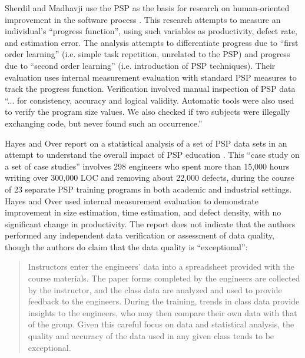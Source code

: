 Sherdil and Madhavji use the PSP as the basis for research on
human-oriented improvement in the software process \cite{Sherdil96}.  This
research attempts to measure an individual's ``progress function'', using
such variables as productivity, defect rate, and estimation error.  The
analysis attempts to differentiate progress due to ``first order learning''
(i.e. simple task repetition, unrelated to the PSP) and progress due to
``second order learning'' (i.e. introduction of PSP techniques).  Their
evaluation uses internal measurement evaluation with standard PSP measures
to track the progress function.  Verification involved manual inspection of
PSP data ``... for consistency, accuracy and logical validity.  Automatic
tools were also used to verify the program size values.  We also checked if
two subjects were illegally exchanging code, but never found such an
occurrence.''  


Hayes and Over report on a statistical analysis of a set of PSP data sets
in an attempt to understand the overall impact of PSP education
\cite{Hayes97}.  This ``case study on a set of case studies'' involves 298
engineers who spent more than 15,000 hours writing over 300,000 LOC and
removing about 22,000 defects, during the course of 23 separate PSP
training programs in both academic and industrial settings.  Hayes and Over
used internal measurement evaluation to demonstrate improvement in size
estimation, time estimation, and defect density, with no significant change
in productivity.  The report does not indicate that the authors performed
any independent data verification or assessment of data quality, though the
authors do claim that the data quality is ``exceptional'':
\begin{quotation}
Instructors enter the engineers' data into a spreadsheet provided with the
course materials.  The paper forms completed by the engineers are collected
by the instructor, and the class data are analyzed and used to provide
feedback to the engineers.  During the training, trends in class data
provide insights to the engineers, who may then compare their own data with 
that of the group.  Given this careful focus on data and statistical
analysis, the quality and accuracy of the data used in any given class
tends to be exceptional.
\end{quotation}

